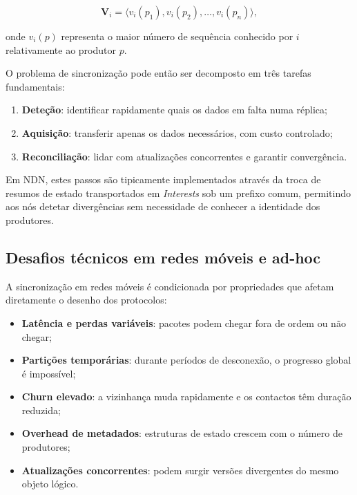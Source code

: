 \[
\mathbf{V}_i = \langle v_i(p_1), v_i(p_2), \dots, v_i(p_n) \rangle,
\]

onde $v_i(p)$ representa o maior número de sequência conhecido por $i$ relativamente ao produtor $p$.

O problema de sincronização pode então ser decomposto em três tarefas fundamentais:

\begin{enumerate}
    \item \textbf{Deteção}: identificar rapidamente quais os dados em falta numa réplica;
    \item \textbf{Aquisição}: transferir apenas os dados necessários, com custo controlado;
    \item \textbf{Reconciliação}: lidar com atualizações concorrentes e garantir convergência.
\end{enumerate}

Em \gls{NDN}, estes passos são tipicamente implementados através da troca de resumos de estado transportados em \textit{Interests} sob um prefixo comum, permitindo aos nós detetar divergências sem necessidade de conhecer a identidade dos produtores.

\subsection{Desafios técnicos em redes móveis e ad-hoc}
\label{sub:desafios_sync}

A sincronização em redes móveis é condicionada por propriedades que afetam diretamente o desenho dos protocolos:

\begin{itemize}
    \item \textbf{Latência e perdas variáveis}: pacotes podem chegar fora de ordem ou não chegar;
    \item \textbf{Partições temporárias}: durante períodos de desconexão, o progresso global é impossível;
    \item \textbf{Churn elevado}: a vizinhança muda rapidamente e os contactos têm duração reduzida;
    \item \textbf{Overhead de metadados}: estruturas de estado crescem com o número de produtores;
    \item \textbf{Atualizações concorrentes}: podem surgir versões divergentes do mesmo objeto lógico.
\end{itemize}

